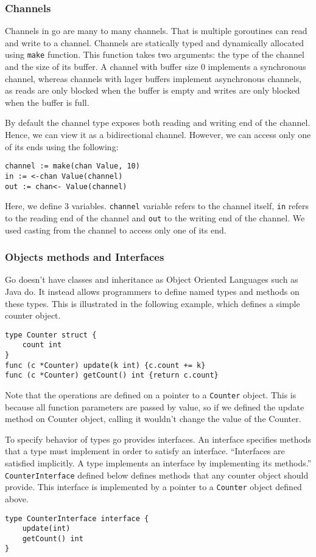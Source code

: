 \documentclass[12pt,a4paper]{article}
\begin{document}
\subsubsection{Channels}
Channels in go are many to many channels. That is multiple goroutines can
read and write to a channel. Channels are statically typed and
dynamically allocated using \texttt{make} function. This function takes 
two arguments: the type of the channel and the size of its buffer.
A channel with buffer size 0 implements a synchronous channel, whereas 
channels with lager buffers implement asynchronous channels, as reads
are only blocked when the buffer is empty and writes are only blocked
when the buffer is full.

By default the channel type exposes both reading and writing end of the
channel. Hence, we can view it as a bidirectional channel. 
However, we can access only one of its ends using the following:
\begin{lstlisting}
channel := make(chan Value, 10)
in := <-chan Value(channel)
out := chan<- Value(channel)
\end{lstlisting}
Here, we define 3 variables. \texttt{channel} variable refers to the 
channel itself, \texttt{in} refers to the reading end of the channel
and \texttt{out} to the writing end of the channel. We used casting
from the channel to access only one of its end.

\subsubsection{Objects methods and Interfaces}
Go doesn't have classes and inheritance as Object Oriented Languages 
such as Java do. It instead allows programmers to define named types
and methods on these types. This is illustrated in the following example,
which defines a simple counter object.
\begin{lstlisting}
type Counter struct {
    count int
}
func (c *Counter) update(k int) {c.count += k}
func (c *Counter) getCount() int {return c.count}
\end{lstlisting}

Note that the operations are defined on a pointer to a \texttt{Counter}
object. This is because all function parameters are passed by value, so
if we defined the update method on Counter object, calling it wouldn't
change the value of the Counter.

To specify behavior of types go provides interfaces. An interface
specifies methods that a type must implement in order to satisfy an 
interface. ``Interfaces are satisfied implicitly. A type implements 
an interface by implementing its methods.'' \cite{tour}
\texttt{CounterInterface} defined below defines methods that any counter
object should provide. This interface is implemented by a pointer to
a \texttt{Counter} object defined above.
\begin{lstlisting}
type CounterInterface interface {
    update(int)
    getCount() int
}
\end{lstlisting}
\end{document}
